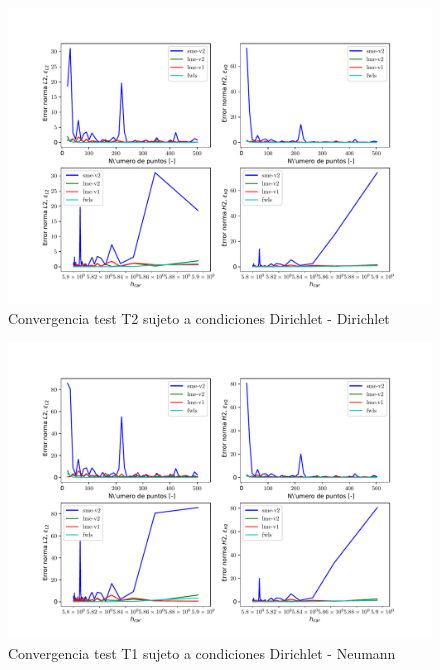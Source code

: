 \begin{figure}
    \centering
    \includegraphics[width=1\textwidth]{./Imagenes/06/comparacion_shp_irreg/T2_irreg_type-2_caso-1_direct_dgesv-lapack-blas_sme-v2_lme-v2_lme-v1_fwls.pdf}
    \caption{Convergencia test T2 sujeto a condiciones Dirichlet - Dirichlet} \label{fig:T2_caso-1_conv_irreg}
\end{figure}
\begin{figure}
    \centering
    \includegraphics[width=1\textwidth]{./Imagenes/06/comparacion_shp_irreg/T2_irreg_type-2_caso-2_direct_dgesv-lapack-blas_sme-v2_lme-v2_lme-v1_fwls.pdf}
    \caption{Convergencia test T1 sujeto a condiciones Dirichlet - Neumann} \label{fig:T2_caso-2_conv_irreg}
\end{figure}
